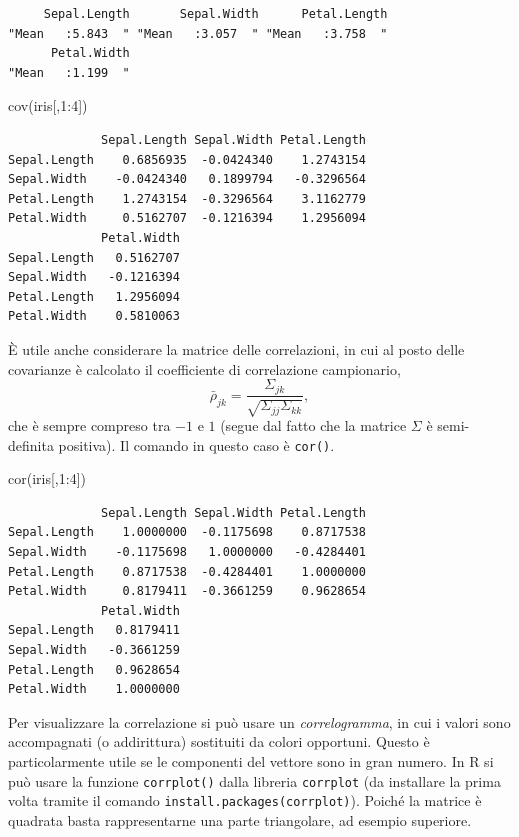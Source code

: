 \documentclass[
  italian,
  letterpaper,
]{book}
\newenvironment{Shaded}{\begin{snugshade}}{\end{snugshade}}
\newcommand{\DecValTok}[1]{\textcolor[rgb]{0.68,0.00,0.00}{#1}}
\newcommand{\FunctionTok}[1]{\textcolor[rgb]{0.28,0.35,0.67}{#1}}
\newcommand{\NormalTok}[1]{\textcolor[rgb]{0.00,0.23,0.31}{#1}}
\newcommand{\SpecialCharTok}[1]{\textcolor[rgb]{0.37,0.37,0.37}{#1}}
\theoremstyle{definition}
\theoremstyle{remark}
\begin{document}
\begin{verbatim}
     Sepal.Length       Sepal.Width      Petal.Length 
"Mean   :5.843  " "Mean   :3.057  " "Mean   :3.758  " 
      Petal.Width 
"Mean   :1.199  " 
\end{verbatim}

\begin{Shaded}
\begin{Highlighting}[]
\FunctionTok{cov}\NormalTok{(iris[,}\DecValTok{1}\SpecialCharTok{:}\DecValTok{4}\NormalTok{])}
\end{Highlighting}
\end{Shaded}

\begin{verbatim}
             Sepal.Length Sepal.Width Petal.Length
Sepal.Length    0.6856935  -0.0424340    1.2743154
Sepal.Width    -0.0424340   0.1899794   -0.3296564
Petal.Length    1.2743154  -0.3296564    3.1162779
Petal.Width     0.5162707  -0.1216394    1.2956094
             Petal.Width
Sepal.Length   0.5162707
Sepal.Width   -0.1216394
Petal.Length   1.2956094
Petal.Width    0.5810063
\end{verbatim}

È utile anche considerare la matrice delle correlazioni, in cui al posto
delle covarianze è calcolato il coefficiente di correlazione
campionario,
\[ \bar{\rho}_{jk} = \frac{ \Sigma_{jk}}{ \sqrt{ \Sigma_{jj} \Sigma_{kk}}},\]
che è sempre compreso tra \(-1\) e \(1\) (segue dal fatto che la matrice
\(\Sigma\) è semi-definita positiva). Il comando in questo caso è
\texttt{cor()}.

\begin{Shaded}
\begin{Highlighting}[]
\FunctionTok{cor}\NormalTok{(iris[,}\DecValTok{1}\SpecialCharTok{:}\DecValTok{4}\NormalTok{])}
\end{Highlighting}
\end{Shaded}

\begin{verbatim}
             Sepal.Length Sepal.Width Petal.Length
Sepal.Length    1.0000000  -0.1175698    0.8717538
Sepal.Width    -0.1175698   1.0000000   -0.4284401
Petal.Length    0.8717538  -0.4284401    1.0000000
Petal.Width     0.8179411  -0.3661259    0.9628654
             Petal.Width
Sepal.Length   0.8179411
Sepal.Width   -0.3661259
Petal.Length   0.9628654
Petal.Width    1.0000000
\end{verbatim}

Per visualizzare la correlazione si può usare un \emph{correlogramma},
in cui i valori sono accompagnati (o addirittura) sostituiti da colori
opportuni. Questo è particolarmente utile se le componenti del vettore
sono in gran numero. In R si può usare la funzione \texttt{corrplot()}
dalla libreria \texttt{corrplot} (da installare la prima volta tramite
il comando
\texttt{install.packages(\textquotesingle{}corrplot\textquotesingle{})}).
Poiché la matrice è quadrata basta rappresentarne una parte triangolare,
ad esempio superiore.
\end{document}
